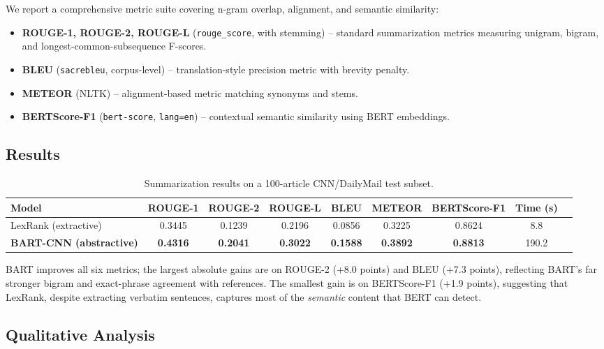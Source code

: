 \documentclass[11pt,a4paper]{article}
\begin{document}
We report a comprehensive metric suite covering n-gram overlap, alignment, and semantic similarity:
\vspace{-0.3em}
\begin{itemize}[noitemsep,leftmargin=1.4em]
    \item \textbf{ROUGE-1, ROUGE-2, ROUGE-L} (\texttt{rouge\_score}, with stemming) -- standard summarization metrics measuring unigram, bigram, and longest-common-subsequence F-scores.
    \item \textbf{BLEU} (\texttt{sacrebleu}, corpus-level) -- translation-style precision metric with brevity penalty.
    \item \textbf{METEOR} (NLTK) -- alignment-based metric matching synonyms and stems.
    \item \textbf{BERTScore-F1} (\texttt{bert-score}, \texttt{lang=en}) -- contextual semantic similarity using BERT embeddings.
\end{itemize}

\subsection{Results}

\begin{table}[h!]
\centering
\small
\caption{Summarization results on a 100-article CNN/DailyMail test subset.}
\begin{tabular}{lcccccccc}
\toprule
\textbf{Model} & \textbf{ROUGE-1} & \textbf{ROUGE-2} & \textbf{ROUGE-L} & \textbf{BLEU} & \textbf{METEOR} & \textbf{BERTScore-F1} & \textbf{Time (s)}\\
\midrule
LexRank (extractive)  & 0.3445 & 0.1239 & 0.2196 & 0.0856 & 0.3225 & 0.8624 & 8.8\\
\textbf{BART-CNN (abstractive)} & \textbf{0.4316} & \textbf{0.2041} & \textbf{0.3022} & \textbf{0.1588} & \textbf{0.3892} & \textbf{0.8813} & 190.2\\
\bottomrule
\end{tabular}
\end{table}

BART improves all six metrics; the largest absolute gains are on ROUGE-2 (+8.0 points) and BLEU (+7.3 points), reflecting BART's far stronger bigram and exact-phrase agreement with references. The smallest gain is on BERTScore-F1 (+1.9 points), suggesting that LexRank, despite extracting verbatim sentences, captures most of the \emph{semantic} content that BERT can detect.

\subsection{Qualitative Analysis}
\end{document}
